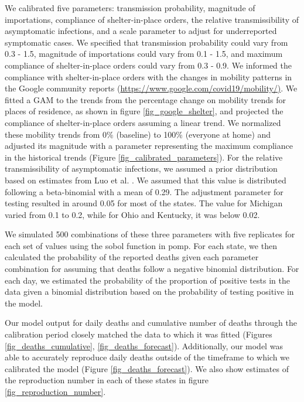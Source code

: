 \documentclass[11pt]{article}
\begin{document}
We calibrated five parameters: transmission probability, magnitude of importations, compliance of shelter-in-place orders, the relative transmissibility of asymptomatic infections, and a scale parameter to adjust for underreported symptomatic cases. We specified that transmission probability could vary from 0.3 - 1.5, magnitude of importations could vary from 0.1 - 1.5, and maximum compliance of shelter-in-place orders could vary from 0.3 - 0.9. We informed the compliance with shelter-in-place orders with the changes in mobility patterns in the Google community reports (\url{https://www.google.com/covid19/mobility/)}. We fitted a GAM to the trends from the percentage change on mobility trends for places of residence, as shown in figure \ref{fig_google_shelter}, and projected the compliance of shelter-in-place orders assuming a linear trend. We normalized these mobility trends from 0\% (baseline) to 100\% (everyone at home) and adjusted its magnitude with a parameter representing the maximum compliance in the historical trends (Figure \ref{fig_calibrated_parameters}). For the relative transmissibility of asymptomatic infections, we assumed a prior distribution based on estimates from Luo et al. \cite{Luo2020_Contact_MedRxiv}. We assumed that this value is distributed following a beta-binomial with a mean of 0.29. The adjustment parameter for testing resulted in around 0.05 for most of the states. The value for Michigan varied from 0.1 to 0.2, while for Ohio and Kentucky, it was below 0.02. 

We simulated 500 combinations of these three parameters with five replicates for each set of values using the sobol function in pomp. For each state, we then calculated the probability of the reported deaths given each parameter combination for assuming that deaths follow a negative binomial distribution. For each day, we estimated the probability of the proportion of positive tests in the data given a binomial distribution based on the probability of testing positive in the model. 

Our model output for daily deaths and cumulative number of deaths through the calibration period closely matched the data to which it was fitted (Figures \ref{fig_deaths_cumulative}, \ref{fig_deaths_forecast}). Additionally, our model was able to accurately reproduce daily deaths outside of the timeframe to which we calibrated the model (Figure \ref{fig_deaths_forecast}). We also show estimates of the reproduction number in each of these states in figure \ref{fig_reproduction_number}. 
\end{document}
